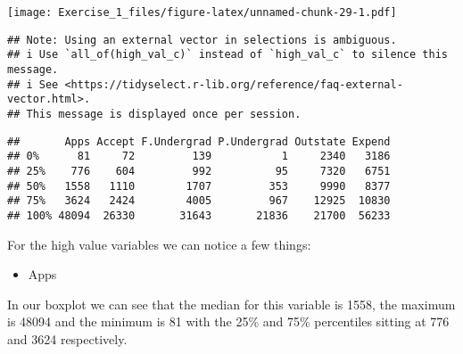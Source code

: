 \documentclass[]{article}
\newenvironment{Shaded}{\begin{snugshade}}{\end{snugshade}}
\newcommand{\CommentTok}[1]{\textcolor[rgb]{0.56,0.35,0.01}{\textit{#1}}}
\newcommand{\DataTypeTok}[1]{\textcolor[rgb]{0.13,0.29,0.53}{#1}}
\newcommand{\KeywordTok}[1]{\textcolor[rgb]{0.13,0.29,0.53}{\textbf{#1}}}
\newcommand{\NormalTok}[1]{#1}
\newcommand{\OperatorTok}[1]{\textcolor[rgb]{0.81,0.36,0.00}{\textbf{#1}}}
\newcommand{\OtherTok}[1]{\textcolor[rgb]{0.56,0.35,0.01}{#1}}
\newcommand{\StringTok}[1]{\textcolor[rgb]{0.31,0.60,0.02}{#1}}
\providecommand{\tightlist}{%
  \setlength{\itemsep}{0pt}\setlength{\parskip}{0pt}}
\begin{document}
\begin{Shaded}
\end{Shaded}

\texttt{[image: Exercise\_1\_files/figure-latex/unnamed-chunk-29-1.pdf]}

\begin{Shaded}
\end{Shaded}

\begin{verbatim}
## Note: Using an external vector in selections is ambiguous.
## i Use `all_of(high_val_c)` instead of `high_val_c` to silence this message.
## i See <https://tidyselect.r-lib.org/reference/faq-external-vector.html>.
## This message is displayed once per session.
\end{verbatim}

\begin{verbatim}
##       Apps Accept F.Undergrad P.Undergrad Outstate Expend
## 0%      81     72         139           1     2340   3186
## 25%    776    604         992          95     7320   6751
## 50%   1558   1110        1707         353     9990   8377
## 75%   3624   2424        4005         967    12925  10830
## 100% 48094  26330       31643       21836    21700  56233
\end{verbatim}

For the high value variables we can notice a few things:

\begin{itemize}
\tightlist
\item
  Apps
\end{itemize}

In our boxplot we can see that the median for this variable is 1558, the
maximum is 48094 and the minimum is 81 with the 25\% and 75\%
percentiles sitting at 776 and 3624 respectively.
\end{document}
